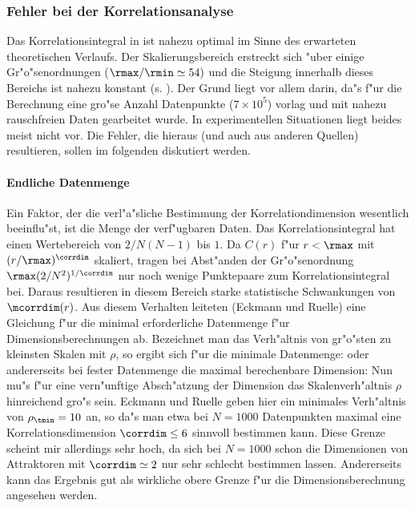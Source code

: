 \subsubsection{Fehler bei der Korrelationsanalyse}
Das Korrelationsintegral in  ist nahezu optimal im Sinne des erwarteten 
theoretischen Verlaufs. Der Skalierungsbereich 
erstreckt sich "uber einige Gr"o"senordnungen ($\rmax/\rmin\simeq 54)$ und die Steigung innerhalb
dieses Bereichs ist nahezu konstant (s. ). Der Grund liegt vor allem
darin, da"s f"ur die Berechnung eine gro"se Anzahl Datenpunkte ($7\times10^5$) vorlag und
mit nahezu rauschfreien Daten gearbeitet wurde. In experimentellen Situationen liegt
beides meist nicht vor. Die Fehler, die hieraus (und auch aus anderen Quellen) resultieren,
sollen im folgenden diskutiert werden.




\paragraph{Endliche Datenmenge}
Ein Faktor, der die verl"a"sliche Bestimmung der Korrelationdimension wesentlich
beeinflu"st, ist die Menge der verf"ugbaren Daten. Das Korrelationsintegral hat einen
Wertebereich von $2/N(N-1)$ bis $1$. Da $C(r)$ f"ur $r<\rmax$ mit $(r/\rmax)^\corrdim$ skaliert, tragen
bei Abst"anden der Gr"o"senordnung $\rmax(2/N^2)^{1/\corrdim}$ nur noch wenige Punktepaare 
zum Korrelationsintegral bei. Daraus resultieren in diesem Bereich starke statistische
Schwankungen von $\mcorrdim(r)$. Aus diesem Verhalten leiteten \autor(Eckmann und Ruelle)
\cite{Eckmann-ruelle2} eine Gleichung f"ur die minimal erforderliche Datenmenge f"ur
Dimensionsberechnungen ab. Bezeichnet man das Verh"altnis von gr"o"sten zu kleinsten
Skalen mit $\rho$, so ergibt sich f"ur die minimale Datenmenge:
oder andererseits bei fester Datenmenge die maximal berechenbare Dimension:
Nun mu"s f"ur eine vern"unftige Absch"atzung der Dimension das Skalenverh"altnis $\rho$
hinreichend gro"s sein. Eckmann und Ruelle geben hier ein minimales Verh"altnis von
$\rho_\tmin=10$ an, so da"s man etwa bei $N=1000$ Datenpunkten maximal eine
Korrelationsdimension $\corrdim\leq 6$ sinnvoll bestimmen kann. Diese Grenze scheint mir
allerdings sehr hoch, da sich bei $N=1000$ schon die Dimensionen von Attraktoren mit
$\corrdim\simeq 2$ nur sehr schlecht bestimmen lassen. Andererseits kann das Ergebnis gut
als wirkliche obere Grenze f"ur die Dimensionsberechnung angesehen werden. 




